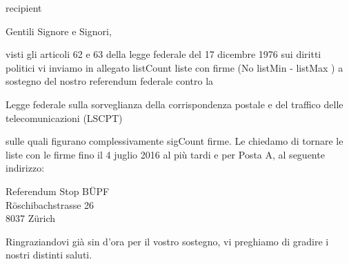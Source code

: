 \documentclass[a4paper,10pt,parskip=half,italian]{scrlttr2}
\begin{document}
\begin{letter}{ {{ recipient }} }





\opening{Gentili Signore e Signori,}

visti gli articoli 62 e 63 della legge federale del 17 dicembre 1976 sui diritti politici vi inviamo in allegato {{ listCount }} liste con firme (No {{ listMin }} - {{ listMax }}) a sostegno del nostro referendum federale contro la

\leftskip=3mm
Legge federale sulla sorveglianza della corrispondenza postale e del traffico delle telecomunicazioni (LSCPT)

\leftskip=0mm
sulle quali figurano complessivamente {{ sigCount }} firme. Le chiedamo di tornare le liste con le firme fino il 4 juglio 2016 al più tardi e per Posta A, al seguente indirizzo:

\leftskip=3mm
Referendum Stop BÜPF \\
Röschibachstrasse 26 \\
8037 Zürich

\leftskip=0mm
\closing{Ringraziandovi già sin d’ora per il vostro sostegno, vi preghiamo di gradire i nostri distinti saluti.}

\end{letter}
\end{document}
